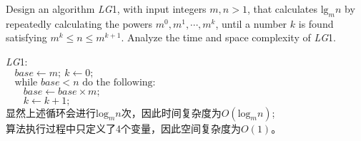 \documentclass[11pt, a4paper, UTF8]{ctexart}
\begin{document}
\begin{problem}[DH: 6.18]
  Design an algorithm \textsl{LG}1, with input integers $m, n > 1$, that calculates 
  $\text{lg}_{m}n$ by repeatedly calculating the powers $m^{0}, m^{1},\cdots,m^{k}$, 
  until a number $k$ is found satisfying $m^{k} \leq n \leq m^{k+1}$. Analyze the time 
  and space complexity of \textsl{LG}1.
\end{problem}

\begin{solution}
  \textsl{LG}1:\\
  $~~~~base \gets m;~k \gets 0;$\\
  $~~~~\text{while } base < n \text{ do the following:}$\\
  $~~~~~~~~base \gets base \times m;$\\
  $~~~~~~~~k \gets k + 1;$\\
  显然上述循环会进行$\text{log}_{m}n$次，因此时间复杂度为$O(\text{log}_{m}n)$;\\
  算法执行过程中只定义了4个变量，因此空间复杂度为$O(1)$。
\end{solution}




\end{document}
